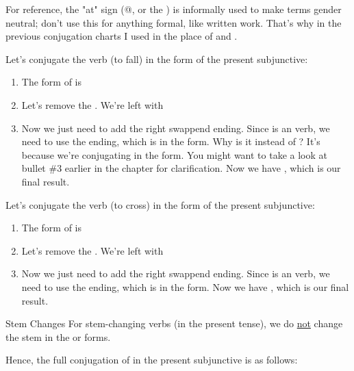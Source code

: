 For reference, the "at" sign (@, or the ) is informally used to make terms gender neutral; don't use this for anything formal, like written work. That's why in the previous conjugation charts I used  in the place of  and . 

Let's conjugate the verb  (to fall) in the  form of the present subjunctive:
\begin{enumerate}[noitemsep]
	\item The  form of  is 
	\item Let's remove the . We're left with 
	\item Now we just need to add the right swappend ending. Since  is an  verb, we need to use the  ending, which is  in the  form. Why is it  instead of ? It's because we're conjugating in the  form. You might want to take a look at bullet \#3 earlier in the chapter for clarification. Now we have , which is our final result. 
\end{enumerate}

Let's conjugate the verb  (to cross) in the  form of the present subjunctive:
\begin{enumerate}[noitemsep]
	\item The  form of  is 
	\item Let's remove the . We're left with 
	\item Now we just need to add the right swappend ending. Since  is an  verb, we need to use the  ending, which is  in the  form. Now we have , which is our final result. 
\end{enumerate}

\begin{conf}{Stem Changes}
	For stem-changing verbs (in the present tense), we do \underline{not} change the stem in the  or  forms. 
\end{conf}

Hence, the full conjugation of  in the present subjunctive is as follows: 

